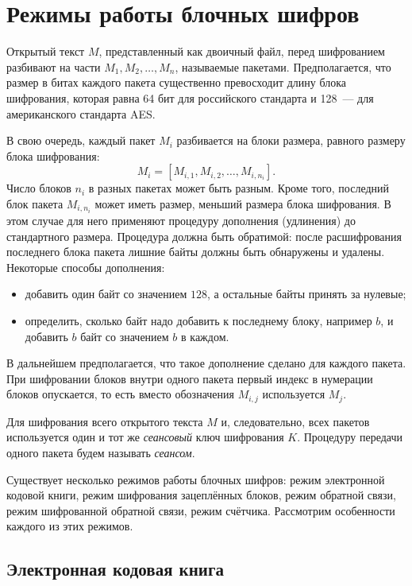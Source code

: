 \section{Режимы работы блочных шифров}\label{section-block-chaining}

Открытый текст $M$, представленный как двоичный файл, перед шифрованием разбивают на части $M_1, M_2, \dots, M_n$, называемые пакетами. Предполагается, что размер в битах каждого пакета существенно превосходит длину блока шифрования, которая равна 64 бит для российского стандарта и 128~--- для американского стандарта AES.

В свою очередь, каждый пакет $M_i$ разбивается на блоки размера, равного размеру блока шифрования:
    \[ M_i = \left[ M_{i,1}, M_{i,2}, \dots, M_{i,n_i} \right]. \]
Число блоков $n_i$ в разных пакетах может быть разным. Кроме того, последний блок пакета $M_{i,n_i}$ может иметь размер, меньший размера блока шифрования. В этом случае для него применяют процедуру дополнения (удлинения) до стандартного размера. Процедура должна быть обратимой: после расшифрования последнего блока пакета лишние байты должны быть обнаружены и удалены. Некоторые способы дополнения:
\begin{itemize}
  \item добавить один байт со значением $128$, а остальные байты принять за нулевые;
  \item определить, сколько байт надо добавить к последнему блоку, например $b$, и добавить $b$ байт со значением $b$ в каждом.
\end{itemize}
В дальнейшем предполагается, что такое дополнение сделано для каждого пакета. При шифровании блоков внутри одного пакета первый индекс в нумерации блоков опускается, то есть вместо обозначения $M_{i,j}$ используется $M_j$.

Для шифрования всего открытого текста $M$ и, следовательно, всех пакетов используется один и тот же \emph{сеансовый} ключ шифрования $K$. Процедуру передачи одного пакета будем называть \emph{сеансом}.

Существует несколько режимов работы блочных шифров: режим электронной кодовой книги, режим шифрования зацеплённых блоков, режим обратной связи, режим шифрованной обратной связи, режим счётчика. Рассмотрим особенности каждого из этих режимов.


\subsection{Электронная кодовая книга}

